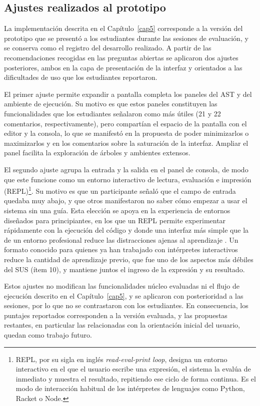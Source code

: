 \subsection{Ajustes realizados al prototipo}
\label{sec:eval-ajustes}

La implementación descrita en el Capítulo~\ref{cap5} corresponde a la versión del prototipo que se presentó a los estudiantes durante las sesiones de evaluación, y se conserva como el registro del desarrollo realizado. A partir de las recomendaciones recogidas en las preguntas abiertas se aplicaron dos ajustes posteriores, ambos en la capa de presentación de la interfaz y orientados a las dificultades de uso que los estudiantes reportaron.

El primer ajuste permite expandir a pantalla completa los paneles del AST y del ambiente de ejecución. Su motivo es que estos paneles constituyen las funcionalidades que los estudiantes señalaron como más útiles (21 y 22 comentarios, respectivamente), pero compartían el espacio de la pantalla con el editor y la consola, lo que se manifestó en la propuesta de poder minimizarlos o maximizarlos y en los comentarios sobre la saturación de la interfaz. Ampliar el panel facilita la exploración de árboles y ambientes extensos.

El segundo ajuste agrupa la entrada y la salida en el panel de consola, de modo que este funcione como un entorno interactivo de lectura, evaluación e impresión (REPL)\footnote{REPL, por su sigla en inglés \textit{read-eval-print loop}, designa un entorno interactivo en el que el usuario escribe una expresión, el sistema la evalúa de inmediato y muestra el resultado, repitiendo ese ciclo de forma continua. Es el modo de interacción habitual de los intérpretes de lenguajes como Python, Racket o Node.}. Su motivo es que un participante señaló que el campo de entrada quedaba muy abajo, y que otros manifestaron no saber cómo empezar a usar el sistema sin una guía. Esta elección se apoya en la experiencia de entornos diseñados para principiantes, en los que un REPL permite experimentar rápidamente con la ejecución del código y donde una interfaz más simple que la de un entorno profesional reduce las distracciones ajenas al aprendizaje \cite{feeley2022codeboot}. Un formato conocido para quienes ya han trabajado con intérpretes interactivos reduce la cantidad de aprendizaje previo, que fue uno de los aspectos más débiles del SUS (ítem 10), y mantiene juntos el ingreso de la expresión y su resultado.

Estos ajustes no modifican las funcionalidades núcleo evaluadas ni el flujo de ejecución descrito en el Capítulo~\ref{cap5}, y se aplicaron con posterioridad a las sesiones, por lo que no se contrastaron con los estudiantes. En consecuencia, los puntajes reportados corresponden a la versión evaluada, y las propuestas restantes, en particular las relacionadas con la orientación inicial del usuario, quedan como trabajo futuro.

